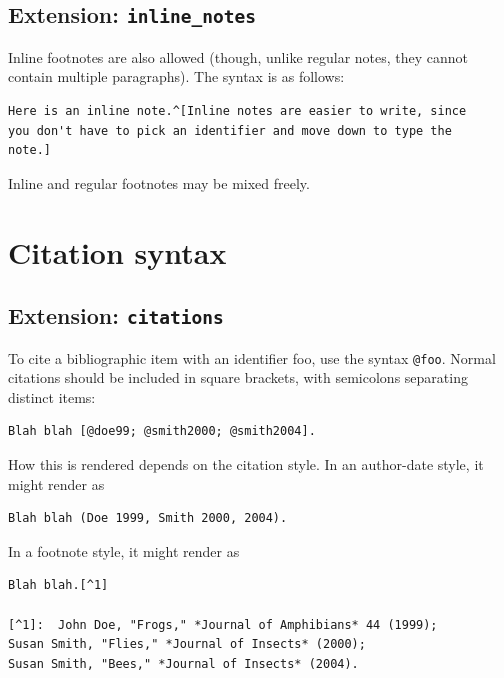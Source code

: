 \documentclass[
  b5paper
]{book}
\begin{document}
\subsection{\texorpdfstring{Extension:
\texttt{inline\_notes}}{Extension: inline\_notes}}\label{extension-inline_notes}

Inline footnotes are also allowed (though, unlike regular notes, they
cannot contain multiple paragraphs). The syntax is as follows:

\begin{verbatim}
Here is an inline note.^[Inline notes are easier to write, since
you don't have to pick an identifier and move down to type the
note.]
\end{verbatim}

Inline and regular footnotes may be mixed freely.

\section{Citation syntax}\label{citation-syntax}

\subsection{\texorpdfstring{Extension:
\texttt{citations}}{Extension: citations}}\label{extension-citations}

To cite a bibliographic item with an identifier foo, use the syntax
\texttt{@foo}. Normal citations should be included in square brackets,
with semicolons separating distinct items:

\begin{verbatim}
Blah blah [@doe99; @smith2000; @smith2004].
\end{verbatim}

How this is rendered depends on the citation style. In an author-date
style, it might render as

\begin{verbatim}
Blah blah (Doe 1999, Smith 2000, 2004).
\end{verbatim}

In a footnote style, it might render as

\begin{verbatim}
Blah blah.[^1]

[^1]:  John Doe, "Frogs," *Journal of Amphibians* 44 (1999);
Susan Smith, "Flies," *Journal of Insects* (2000);
Susan Smith, "Bees," *Journal of Insects* (2004).
\end{verbatim}
\end{document}
